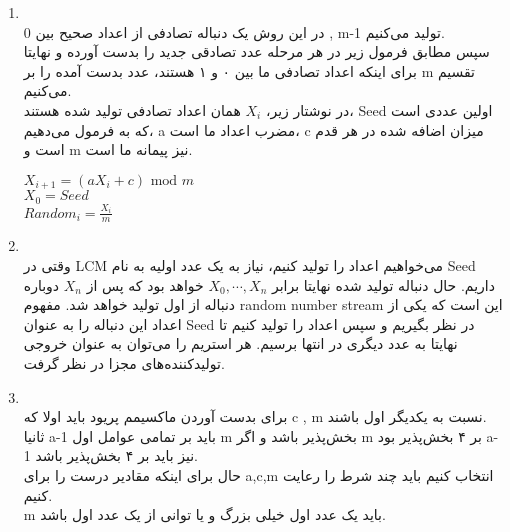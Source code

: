 \begin{enumerate}
    \item \phantom{text}
          \\
          در این روش یک دنباله تصادفی از اعداد صحیح بین 0 , m-1 تولید می‌کنیم.
          \\
          سپس مطابق فرمول زیر در هر مرحله عدد تصادقی جدید را بدست آورده و نهایتا برای اینکه اعداد تصادفی ما بین ۰ و ۱ هستند، عدد بدست آمده را بر m تقسیم می‌کنیم.
          \\
          در نوشتار زیر، $X_i$ همان اعداد تصادفی تولید شده هستند، Seed اولین عددی است که به فرمول می‌دهیم، a مضرب اعداد ما است، c میزان اضافه شده در هر قدم است و m نیز پیمانه ما است.
          \begin{latin}
              $X_{i+1} = (aX_i+c) \text{ mod } m$
              \\
              $X_0 = Seed$
              \\
              $Random_i=\frac{X_i}{m}$
          \end{latin}
    \item \phantom{text}
          \\
          وقتی در LCM می‌خواهیم اعداد را تولید کنیم، نیاز به یک عدد اولیه به نام Seed داریم. حال دنباله تولید شده
          نهایتا برابر $X_0,\cdots,X_n$ خواهد بود که پس از $X_n$ دوباره دنباله از اول تولید خواهد شد. مفهوم random number stream
          این است که یکی از اعداد این دنباله را به عنوان Seed در نظر بگیریم و سپس اعداد را تولید کنیم تا نهایتا به عدد دیگری در انتها برسیم.
          هر استریم را می‌توان به عنوان خروجی تولیدکننده‌های مجزا در نظر گرفت.
    \item \phantom{text}
          \\
          برای بدست آوردن ماکسیمم پریود باید اولا که c , m نسبت به یکدیگر اول باشند.
          \\
          ثانیا a-1 باید بر تمامی عوامل اول m بخش‌پذیر باشد و اگر m بر ۴ بخش‌پذیر بود a-1 نیز باید بر ۴ بخش‌پذیر باشد.
          \\
          حال برای اینکه مقادیر درست را برای a,c,m انتخاب کنیم باید چند شرط را رعایت کنیم.
          \\
          m باید یک عدد اول خیلی بزرگ و یا توانی از یک عدد اول باشد.


\end{enumerate}
